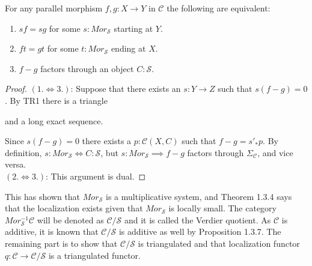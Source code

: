     \begin{prop}
        For any parallel morphism $f,g:X\rightarrow Y$ in $\mathcal{C}$ the following are equivalent:
        \begin{enumerate}
            \item $sf=sg$ for some $s:Mor_\mathcal{S}$ starting at $Y$.
            \item $ft=gt$ for some $t:Mor_\mathcal{S}$ ending at $X$.
            \item $f-g$ factors through an object $C:\mathcal{S}$.
        \end{enumerate}
    \end{prop}

    \begin{proof}
        $(1.\iff 3.)$:
        Suppose that there exists an $s:Y\rightarrow Z$ such that $s(f-g)=0$. By TR1 there is a triangle  and a long exact sequence.
        \begin{center}
        \end{center}
        Since $s(f-g)=0$ there exists a $p:\mathcal{C}(X,C)$ such that $f-g = s'_*p$. By definition, $s:Mor_\mathcal{S}\iff C:\mathcal{S}$, but $s:Mor_\mathcal{S}\implies f-g$ factors through $\Sigma_{\mathcal{C}}$, and vice versa. \\

        $(2.\iff 3.)$: This argument is dual.
    \end{proof}

    This has shown that $Mor_\mathcal{S}$ is a multiplicative system, and Theorem 1.3.4 says that the localization exists given that $Mor_\mathcal{S}$ is locally small. The category $Mor_\mathcal{S}^{-1}\mathcal{C}$ will be denoted as $\mathcal{C}/\mathcal{S}$ and it is called the Verdier quotient. As $\mathcal{C}$ is additive, it is known that $\mathcal{C}/\mathcal{S}$ is additive as well by Proposition 1.3.7. The remaining part is to show that $\mathcal{C}/\mathcal{S}$ is triangulated and that localization functor $q:\mathcal{C}\rightarrow \mathcal{C}/\mathcal{S}$ is a triangulated functor.

